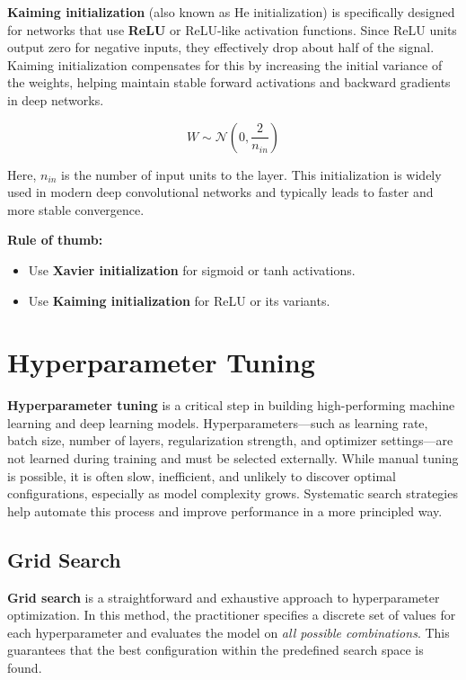 \documentclass{article}
\begin{document}
\textbf{Kaiming initialization} (also known as He initialization) is specifically designed for networks that use \textbf{ReLU} or ReLU-like activation functions. Since ReLU units output zero for negative inputs, they effectively drop about half of the signal. Kaiming initialization compensates for this by increasing the initial variance of the weights, helping maintain stable forward activations and backward gradients in deep networks.

\[
W \sim \mathcal{N}\left(0, \frac{2}{n_{in}}\right)
\]

Here, \(n_{in}\) is the number of input units to the layer. This initialization is widely used in modern deep convolutional networks and typically leads to faster and more stable convergence.

\medskip
\noindent\textbf{Rule of thumb:}
\begin{itemize}
    \item Use \textbf{Xavier initialization} for sigmoid or tanh activations.
    \item Use \textbf{Kaiming initialization} for ReLU or its variants.
\end{itemize}

\section{Hyperparameter Tuning}

\textbf{Hyperparameter tuning} is a critical step in building high-performing machine learning and deep learning models. Hyperparameters—such as learning rate, batch size, number of layers, regularization strength, and optimizer settings—are not learned during training and must be selected externally. While manual tuning is possible, it is often slow, inefficient, and unlikely to discover optimal configurations, especially as model complexity grows. Systematic search strategies help automate this process and improve performance in a more principled way.

\subsection{Grid Search}

\textbf{Grid search} is a straightforward and exhaustive approach to hyperparameter optimization. In this method, the practitioner specifies a discrete set of values for each hyperparameter and evaluates the model on \emph{all possible combinations}. This guarantees that the best configuration within the predefined search space is found.
\end{document}
